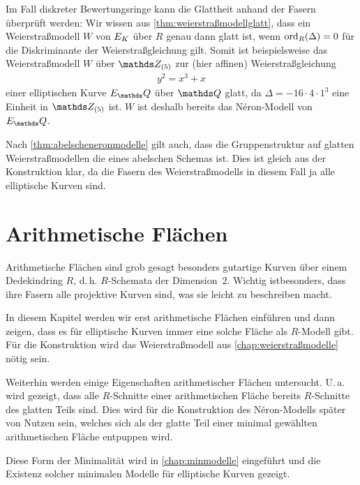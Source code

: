 \documentclass[german, bibliography=totoc]{scrreprt}
\begin{document}
\begin{Bemerkung}
  Im Fall diskreter Bewertungsringe kann die Glattheit anhand der Fasern
  überprüft werden:
  Wir wissen aus \ref{thm:weierstraßmodellglatt},
  dass ein Weierstraßmodell $W$ von $E_{K}$ über $R$ genau dann glatt
  ist, wenn $\operatorname{ord}_R(\Delta)=0$ für die Diskriminante der
  Weierstraßgleichung gilt.
  Somit ist beispielsweise das Weierstraßmodell $W$ über $\Z_{(5)}$
  zur (hier affinen) Weierstraßgleichung
  \begin{gather*}
    y^2=x^3+x
  \end{gather*}
  einer elliptischen Kurve $E_\Q$ über $\Q$ glatt, da
  $\Delta=-16\cdot4\cdot1^3$ eine Einheit in $\Z_{(5)}$ ist.
  $W$ ist deshalb bereits das Néron-Modell von $E_\Q$.

  Nach \ref{thm:abelscheneronmodelle} gilt auch, dass die
  Gruppenstruktur auf glatten Weierstraßmodellen die eines abelschen
  Schemas ist.
  Dies ist gleich aus der Konstruktion klar, da die Fasern des
  Weierstraßmodells in diesem Fall ja alle elliptische Kurven sind.
\end{Bemerkung}



\chapter{Arithmetische Flächen}\label{chap:arithmetischeflächen}
Arithmetische Flächen sind grob gesagt besonders gutartige Kurven über
einem Dedekindring $R$, d.\,h. $R$-Schemata der Dimension~2.
Wichtig istbesonders, dass ihre Fasern alle projektive Kurven sind,
was sie leicht zu beschreiben macht.

In diesem Kapitel werden wir erst arithmetische Flächen einführen und
dann zeigen, dass es für elliptische Kurven immer eine solche Fläche
als $R$-Modell gibt. Für die Konstruktion wird das Weierstraßmodell
aus \autoref{chap:weierstraßmodelle} nötig sein.

Weiterhin werden einige Eigenschaften arithmetischer Flächen
untersucht. U.\,a. wird gezeigt, dass alle $R$-Schnitte einer
arithmetischen Fläche bereits $R$-Schnitte des glatten Teils
sind. Dies wird für die Konstruktion des Néron-Modells später von
Nutzen sein, welches sich als der glatte Teil einer minimal gewählten
arithmetischen Fläche entpuppen wird.

Diese Form der Minimalität wird in \autoref{chap:minmodelle}
eingeführt und die Existenz solcher minimalen Modelle für elliptische
Kurven gezeigt.
\end{document}
